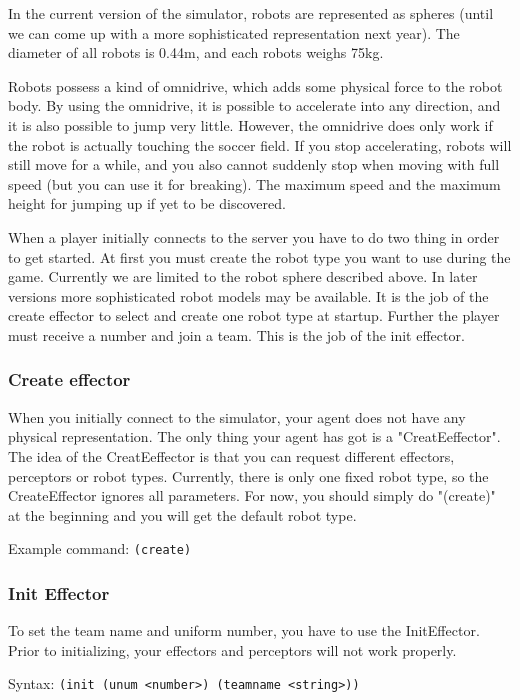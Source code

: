In the current version of the simulator, robots are represented as
spheres (until we can come up with a more sophisticated representation
next year). The diameter of all robots is 0.44m, and each robots
weighs 75kg.

Robots possess a kind of omnidrive, which adds some physical force to
the robot body. By using the omnidrive, it is possible to accelerate
into any direction, and it is also possible to jump very little.
However, the omnidrive does only work if the robot is actually
touching the soccer field. If you stop accelerating, robots will still
move for a while, and you also cannot suddenly stop when moving with
full speed (but you can use it for breaking). The maximum speed and
the maximum height for jumping up if yet to be discovered.

When a player initially connects to the server you have to do two
thing in order to get started. At first you must create the robot type
you want to use during the game. Currently we are limited to the robot
sphere described above. In later versions more sophisticated robot
models may be available. It is the job of the create effector to
select and create one robot type at startup. Further the player must
receive a number and join a team. This is the job of the init
effector.

\subsubsection{Create effector}

When you initially connect to the simulator, your agent does not have
any physical representation. The only thing your agent has got is a
"CreatEeffector". The idea of the CreatEeffector is that you can
request different effectors, perceptors or robot types. Currently,
there is only one fixed robot type, so the CreateEffector ignores all
parameters. For now, you should simply do "(create)" at the beginning
and you will get the default robot type.

Example command: \texttt{(create)}

\subsubsection{Init Effector}

To set the team name and uniform number, you have to use the
InitEffector. Prior to initializing, your effectors and perceptors
will not work properly.  

Syntax: \texttt{(init (unum <number>) (teamname <string>))}

